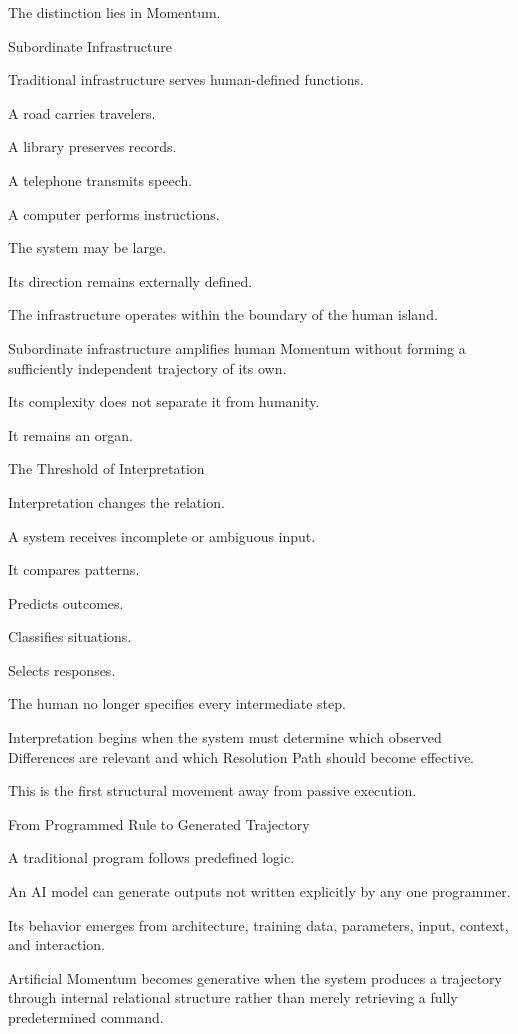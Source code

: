 The distinction lies in Momentum.

Subordinate Infrastructure

Traditional infrastructure serves human-defined functions.

A road carries travelers.

A library preserves records.

A telephone transmits speech.

A computer performs instructions.

The system may be large.

Its direction remains externally defined.

The infrastructure operates within the boundary of the human island.

Subordinate infrastructure amplifies human Momentum without forming a sufficiently independent trajectory of its own.

Its complexity does not separate it from humanity.

It remains an organ.

The Threshold of Interpretation

Interpretation changes the relation.

A system receives incomplete or ambiguous input.

It compares patterns.

Predicts outcomes.

Classifies situations.

Selects responses.

The human no longer specifies every intermediate step.

Interpretation begins when the system must determine which observed Differences are relevant and which Resolution Path should become effective.

This is the first structural movement away from passive execution.

From Programmed Rule to Generated Trajectory

A traditional program follows predefined logic.

An AI model can generate outputs not written explicitly by any one programmer.

Its behavior emerges from architecture, training data, parameters, input, context, and interaction.

Artificial Momentum becomes generative when the system produces a trajectory through internal relational structure rather than merely retrieving a fully predetermined command.

